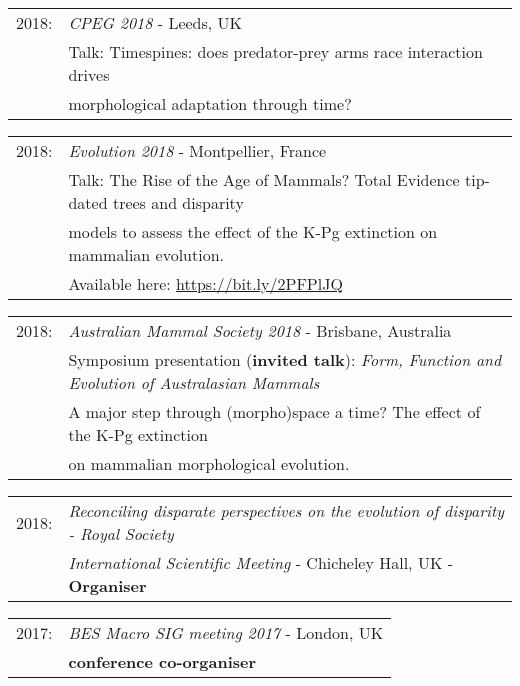 \documentclass[10pt,a4paper]{article}
\begin{document}
{\begin{tabular}{ll}
\end{tabular}
\begin{tabular}{ll}
2018: & \textit{CPEG 2018} - Leeds, UK\\
      & Talk: Timespines: does predator-prey arms race interaction drives\\
      & morphological adaptation through time?\\
\end{tabular}
\begin{tabular}{ll}
2018: & \textit{Evolution 2018} - Montpellier, France\\
      & Talk: The Rise of the Age of Mammals? Total Evidence tip-dated trees and disparity\\
      & models to assess the effect of the K-Pg extinction on mammalian evolution.\\
      & Available here: \href{https://figshare.com/articles/Evolution_2018_Talk/6983210}{https://bit.ly/2PFPlJQ}\\
\end{tabular}
\begin{tabular}{ll}
2018: & \textit{Australian Mammal Society 2018} - Brisbane, Australia\\
      & Symposium presentation (\textbf{invited talk}): \textit{Form, Function and Evolution of Australasian Mammals}\\ 
      & A major step through (morpho)space a time? The effect of the K-Pg extinction\\
      & on mammalian morphological evolution.\\
\end{tabular}
\begin{tabular}{ll}
2018: & \textit{Reconciling disparate perspectives on the evolution of disparity - Royal Society}\\
      & \textit{International Scientific Meeting} - Chicheley Hall, UK - \textbf{Organiser}\\
\end{tabular}
\begin{tabular}{ll}
2017: & \textit{BES Macro SIG meeting 2017} - London, UK\\
      & \textbf{conference co-organiser}\\
\end{tabular}
}
\end{document}
